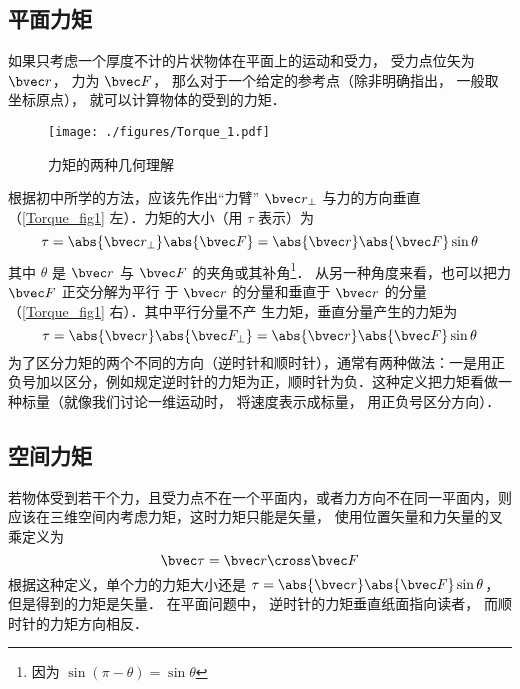 

\subsection{平面力矩}

如果只考虑一个厚度不计的片状物体在平面上的运动和受力， 受力点位矢为 $\bvec r$， 力为 $\bvec F$， 那么对于一个给定的参考点（除非明确指出， 一般取坐标原点）， 就可以计算物体的受到的力矩．

\begin{figure}[ht]
\centering
\texttt{[image: ./figures/Torque\_1.pdf]}
\caption{力矩的两种几何理解}\label{Torque_fig1}
\end{figure}

根据初中所学的方法，应该先作出“力臂” $\bvec r_ \bot$ 与力的方向垂直（\autoref{Torque_fig1} 左）．力矩的大小（用 $\tau$ 表示）为
\begin{equation}\label{Torque_eq2}
\tau = \abs{\bvec r_ \bot } \abs{\bvec F} = \abs{\bvec r} \abs{\bvec F} \sin \theta 
\end{equation}
其中 $\theta $ 是 $\bvec r$ 与 $\bvec F$ 的夹角或其补角\footnote{因为 $\sin(\pi - \theta) = \sin\theta$}． 从另一种角度来看，也可以把力 $\bvec F$ 正交分解为平行
于 $\bvec r$ 的分量和垂直于 $\bvec r$ 的分量（\autoref{Torque_fig1} 右）．其中平行分量不产
生力矩，垂直分量产生的力矩为
\begin{equation}\label{Torque_eq1}
\tau = \abs{\bvec r} \abs{\bvec F_ \bot } = \abs{\bvec r} \abs{\bvec F} \sin \theta 
\end{equation}
为了区分力矩的两个不同的方向（逆时针和顺时针），通常有两种做法：一是用正负号加以区分，例如规定逆时针的力矩为正，顺时针为负．这种定义把力矩看做一种标量（就像我们讨论一维运动时， 将速度表示成标量， 用正负号区分方向）．

\subsection{空间力矩}
若物体受到若干个力，且受力点不在一个平面内，或者力方向不在同一平面内，则应该在三维空间内考虑力矩，这时力矩只能是矢量， 使用位置矢量和力矢量的叉乘定义为
\begin{equation}\label{Torque_eq3}
\bvec \tau = \bvec r \cross \bvec F
\end{equation}
根据这种定义，单个力的力矩大小还是 $\tau = \abs{\bvec r} \abs{\bvec F}\sin \theta$， 但是得到的力矩是矢量． 在平面问题中， 逆时针的力矩垂直纸面指向读者， 而顺时针的力矩方向相反．

